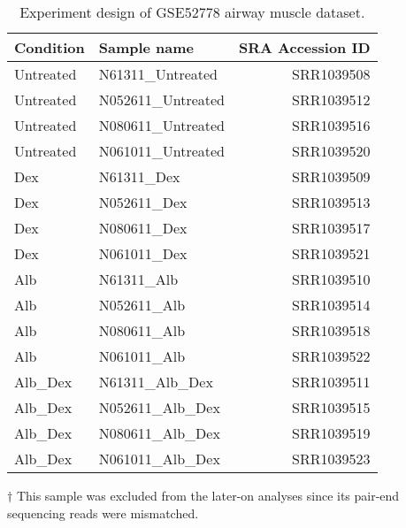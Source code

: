 \begin{table}[!htbp]
    \caption[Experiment design of GSE52778 airway muscle dataset]{
        Experiment design of GSE52778 airway muscle dataset.
    }
    \label{tab:dataset-airway}
    \centering
    \begin{threeparttable}
        \begin{tabular}{llr}
            \toprule
            Condition & Sample name & SRA Accession ID \\
            \midrule
            Untreated & N61311\_Untreated  & SRR1039508 \\
            Untreated & N052611\_Untreated & SRR1039512 \\
            Untreated & N080611\_Untreated & SRR1039516 \\
            Untreated & N061011\_Untreated & SRR1039520 \\

            Dex       & N61311\_Dex        & SRR1039509 \\
            Dex       & N052611\_Dex       & SRR1039513 \\
            Dex       & N080611\_Dex       & SRR1039517 \\
            Dex       & N061011\_Dex       & SRR1039521 \\

            Alb       & N61311\_Alb        & SRR1039510 \\
            Alb       & N052611\_Alb       & SRR1039514 \\
            Alb       & N080611\_Alb       & SRR1039518 \\
            Alb       & N061011\_Alb       & SRR1039522 \\

            Alb\_Dex  & N61311\_Alb\_Dex   & SRR1039511 \\
            Alb\_Dex  & N052611\_Alb\_Dex\tnote{$\dagger$} & SRR1039515\tnote{$\dagger$} \\
            Alb\_Dex  & N080611\_Alb\_Dex  & SRR1039519 \\
            Alb\_Dex  & N061011\_Alb\_Dex  & SRR1039523 \\
            \bottomrule
        \end{tabular}
        \begin{tablenotes}
        \item[$\dagger$] This sample was excluded from the later-on analyses
            since its pair-end sequencing reads were mismatched.
        \end{tablenotes}
    \end{threeparttable}
\end{table}
